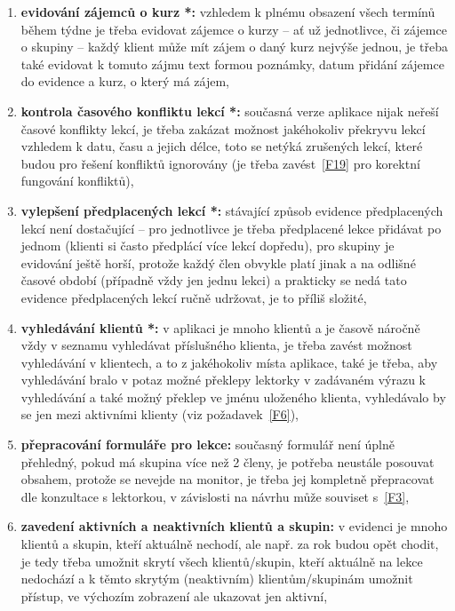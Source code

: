 \begin{enumerate}[label=\textbf{F\arabic*}]
    \item \label{F1} \textbf{evidování zájemců o kurz *:} vzhledem k plnému obsazení všech termínů během týdne je třeba evidovat zájemce o kurzy -- ať už jednotlivce, či zájemce o skupiny -- každý klient může mít zájem o daný kurz nejvýše jednou, je třeba také evidovat k tomuto zájmu text formou poznámky, datum přidání zájemce do evidence a kurz, o který má zájem,
    \item \label{F2} \textbf{kontrola časového konfliktu lekcí *:} současná verze aplikace nijak neřeší časové konflikty lekcí, je třeba zakázat možnost jakéhokoliv překryvu lekcí vzhledem k datu, času a jejich délce, toto se netýká zrušených lekcí, které budou pro řešení konfliktů ignorovány (je třeba zavést~\ref{F19} pro korektní fungování konfliktů),
    \item \label{F3} \textbf{vylepšení předplacených lekcí *:} stávající způsob evidence předplacených lekcí není dostačující -- pro jednotlivce je třeba předplacené lekce přidávat po jednom (klienti si často předplácí více lekcí dopředu), pro skupiny je evidování ještě horší, protože každý člen obvykle platí jinak a na odlišné časové období (případně vždy jen jednu lekci) a prakticky se nedá tato evidence předplacených lekcí ručně udržovat, je to příliš složité,
    \item \label{F4} \textbf{vyhledávání klientů *:} v aplikaci je mnoho klientů a je časově náročně vždy v seznamu vyhledávat příslušného klienta, je třeba zavést možnost vyhledávání v klientech, a to z jakéhokoliv místa aplikace, také je třeba, aby vyhledávání bralo v potaz možné překlepy lektorky v zadávaném výrazu k vyhledávání a také možný překlep ve jménu uloženého klienta, vyhledávalo by se jen mezi aktivními klienty (viz požadavek~\ref{F6}),
    \item \label{F5} \textbf{přepracování formuláře pro lekce:} současný formulář není úplně přehledný, pokud má skupina více než 2 členy, je potřeba neustále posouvat obsahem, protože se nevejde na monitor, je třeba jej kompletně přepracovat dle konzultace s lektorkou, v závislosti na návrhu může souviset s~\ref{F3},
    \item \label{F6} \textbf{zavedení aktivních a neaktivních klientů a skupin:} v evidenci je mnoho klientů a skupin, kteří aktuálně nechodí, ale např. za rok budou opět chodit, je tedy třeba umožnit skrytí všech klientů/skupin, kteří aktuálně na lekce nedochází a k těmto skrytým (neaktivním) klientům/skupinám umožnit přístup, ve výchozím zobrazení ale ukazovat jen aktivní,

\end{enumerate}
